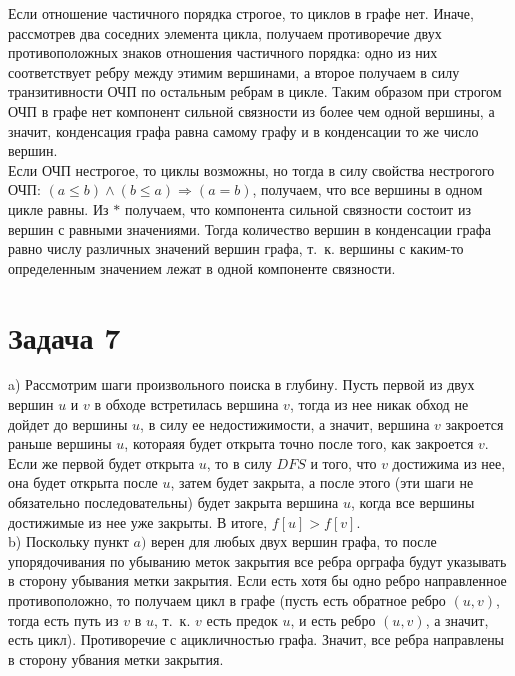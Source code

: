 \documentclass[a4paper,12pt]{article} %
\begin{document}
Если отношение частичного порядка строгое, то циклов в графе нет. Иначе,  рассмотрев два соседних элемента цикла, получаем противоречие двух противоположных знаков отношения частичного порядка: одно из них соответствует ребру между этимим вершинами, а второе получаем в силу транзитивности ОЧП по остальным ребрам в цикле. Таким образом при строгом ОЧП в графе нет компонент сильной связности из более чем одной вершины, а значит, конденсация графа равна самому графу и в конденсации то же число вершин.\\

Если ОЧП нестрогое, то циклы возможны, но тогда в силу свойства нестрогого ОЧП: $(a\leq b)\wedge(b\leq a)\Rightarrow (a= b) $, получаем, что все вершины в одном цикле равны. Из $*$ получаем, что компонента сильной связности состоит из вершин с равными значениями. Тогда количество вершин в конденсации графа равно числу различных значений вершин графа, т.~к. вершины с каким-то определенным значением лежат в одной компоненте связности.\\

\section*{Задача 7}
a) Рассмотрим шаги произвольного поиска в глубину. Пусть первой из двух вершин $u $ и $v$ в обходе встретилась вершина $v$, тогда из нее никак обход не дойдет до вершины $u$, в силу ее недостижимости, а значит, вершина $v$ закроется раньше вершины $u$, котораяя будет открыта точно после того, как закроется $v$. Если же первой будет открыта $u$, то в силу $DFS$ и того, что $v$ достижима из нее, она будет открыта после $u$, затем будет закрыта, а после этого (эти шаги не обязательно последовательны) будет закрыта вершина $u$, когда все вершины достижимые из нее уже закрыты. В итоге, $f[u]>f[v]$.\\

b) Поскольку пункт $a)$ верен для любых двух вершин графа, то после упорядочивания по убыванию меток закрытия все ребра орграфа будут указывать в сторону убывания метки закрытия. Если есть хотя бы одно ребро направленное противоположно, то получаем цикл в графе (пусть есть обратное ребро $(u,v)$, тогда есть путь из $v$ в $u$, т.~к. $v$ есть предок $u$, и есть ребро $(u,v)$, а значит, есть цикл). Противоречие с ацикличностью графа. Значит, все ребра направлены в сторону убвания метки закрытия.\\
\end{document}
